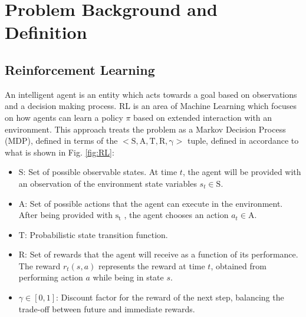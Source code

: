 \documentclass[conference]{IEEEtran}
\begin{document}
\section{Problem Background and Definition} \label{problem}
\subsection{Reinforcement Learning}
An intelligent agent is an entity which acts towards a goal based on observations and a decision making process. RL is an area of Machine Learning which focuses on how agents can learn a policy $\pi$ based on extended interaction with an environment.
This approach treats the problem as a Markov Decision Process (MDP), defined in terms of the  $\mathrm{<S, A, T, R, \gamma>}$ tuple, defined in accordance to what is shown in Fig. \ref{fig:RL}:
\begin{itemize}
    \item $\mathrm{S}$: Set of possible observable states. At time $t$, the agent will be provided with an observation of the environment state variables $s_t \in \mathrm{S}$.
    
    \item $\mathrm{A}$: Set of possible actions that the agent can execute in the environment. After being provided with $\mathrm{s_t}$ , the agent chooses an action $a_t \in \mathrm{A}$.
    
    \item $\mathrm{T}$: Probabilistic state transition function.
    
    \item $\mathrm{R}$: Set of rewards that the agent will receive as a function of its performance. The reward $r_t(s,a)$ represents the reward at time $t$, obtained from performing action $a$ while being in state $s$.
    
    \item $\gamma \in [0,1]$: Discount factor for the reward of the next step, balancing the trade-off between future and immediate rewards.
\end{itemize}
\end{document}

